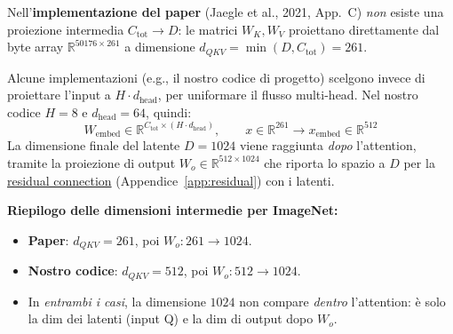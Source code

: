 \documentclass[
  11pt,
]{article}
\begin{document}
\begin{formulabox}[title={\textbf{Proiezione lineare dell'input (non nel paper originale)}}]
Nell'\textbf{implementazione del paper} (Jaegle et al., 2021, App.\ C) \emph{non} esiste una proiezione intermedia $C_{\text{tot}} \to D$: le matrici $W_K, W_V$ proiettano direttamente dal byte array $\mathbb{R}^{50176 \times 261}$ a dimensione $d_{QKV} = \min(D, C_{\text{tot}}) = 261$.

Alcune implementazioni (e.g., il nostro codice di progetto) scelgono invece di proiettare l'input a $H \cdot d_{\text{head}}$, per uniformare il flusso multi-head. Nel nostro codice $H = 8$ e $d_{\text{head}} = 64$, quindi:
\[
W_{\text{embed}} \in \mathbb{R}^{C_{\text{tot}} \times (H \cdot d_{\text{head}})},\qquad x \in \mathbb{R}^{261} \longrightarrow x_{\text{embed}} \in \mathbb{R}^{512}
\]
La dimensione finale del latente $D = 1024$ viene raggiunta \emph{dopo} l'attention, tramite la proiezione di output $W_o \in \mathbb{R}^{512 \times 1024}$ che riporta lo spazio a $D$ per la \hyperref[app:residual]{residual connection} (Appendice~\ref{app:residual}) con i latenti.

\textbf{Riepilogo delle dimensioni intermedie per ImageNet:}
\begin{itemize}
\item \textbf{Paper}: $d_{QKV} = 261$, poi $W_o: 261 \to 1024$.
\item \textbf{Nostro codice}: $d_{QKV} = 512$, poi $W_o: 512 \to 1024$.
\item In \emph{entrambi i casi}, la dimensione $1024$ non compare \emph{dentro} l'attention: è solo la dim dei latenti (input Q) e la dim di output dopo $W_o$.
\end{itemize}
\end{formulabox}
\end{document}

